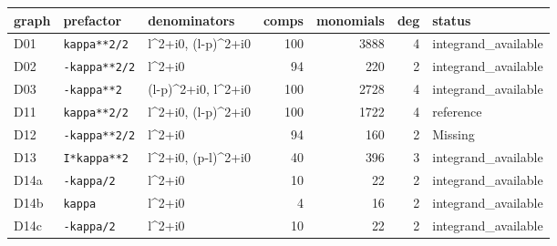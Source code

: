 \begin{center}\small
\begin{tabular}{@{}lllrrrl@{}}
\toprule graph & prefactor & denominators & comps & monomials & deg & status \\ \midrule
D01 & \texttt{kappa**2/2} & l\^{}2+i0, (l-p)\^{}2+i0 & 100 & 3888 & 4 & integrand\_available \\
D02 & \texttt{-kappa**2/2} & l\^{}2+i0 & 94 & 220 & 2 & integrand\_available \\
D03 & \texttt{-kappa**2} & (l-p)\^{}2+i0, l\^{}2+i0 & 100 & 2728 & 4 & integrand\_available \\
D11 & \texttt{kappa**2/2} & l\^{}2+i0, (l-p)\^{}2+i0 & 100 & 1722 & 4 & reference \\
D12 & \texttt{-kappa**2/2} & l\^{}2+i0 & 94 & 160 & 2 & Missing \\
D13 & \texttt{I*kappa**2} & l\^{}2+i0, (p-l)\^{}2+i0 & 40 & 396 & 3 & integrand\_available \\
D14a & \texttt{-kappa/2} & l\^{}2+i0 & 10 & 22 & 2 & integrand\_available \\
D14b & \texttt{kappa} & l\^{}2+i0 & 4 & 16 & 2 & integrand\_available \\
D14c & \texttt{-kappa/2} & l\^{}2+i0 & 10 & 22 & 2 & integrand\_available \\
\bottomrule
\end{tabular}
\end{center}
